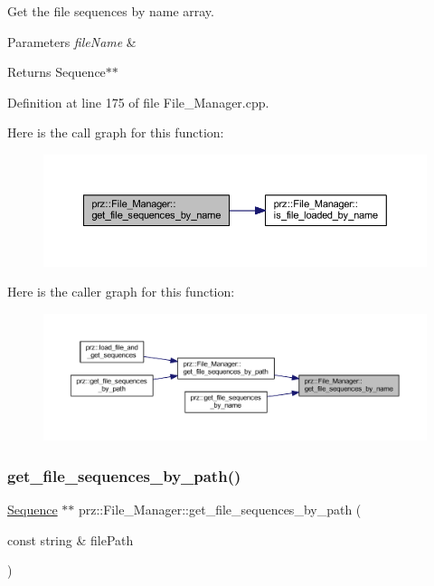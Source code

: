 Get the file sequences by name array. 


\begin{DoxyParams}{Parameters}
{\em file\+Name} & \\
\hline
\end{DoxyParams}
\begin{DoxyReturn}{Returns}
Sequence$\ast$$\ast$ 
\end{DoxyReturn}


Definition at line 175 of file File\+\_\+\+Manager.\+cpp.

Here is the call graph for this function\+:
\nopagebreak
\begin{figure}[H]
\begin{center}
\leavevmode
\includegraphics[width=350pt]{classprz_1_1_file___manager_a9e617521f5fa135f8ecb4b967eed4b7c_cgraph}
\end{center}
\end{figure}
Here is the caller graph for this function\+:
\nopagebreak
\begin{figure}[H]
\begin{center}
\leavevmode
\includegraphics[width=350pt]{classprz_1_1_file___manager_a9e617521f5fa135f8ecb4b967eed4b7c_icgraph}
\end{center}
\end{figure}
\mbox{\label{classprz_1_1_file___manager_a75c22ac120dc18a061d5c2c68f965d0b}} 
\subsubsection{\texorpdfstring{get\_file\_sequences\_by\_path()}{get\_file\_sequences\_by\_path()}}
{\footnotesize\ttfamily \mbox{\hyperlink{classprz_1_1_sequence}{Sequence}} $\ast$$\ast$ prz\+::\+File\+\_\+\+Manager\+::get\+\_\+file\+\_\+sequences\+\_\+by\+\_\+path (\begin{DoxyParamCaption}\item[{const string \&}]{file\+Path }\end{DoxyParamCaption})}



